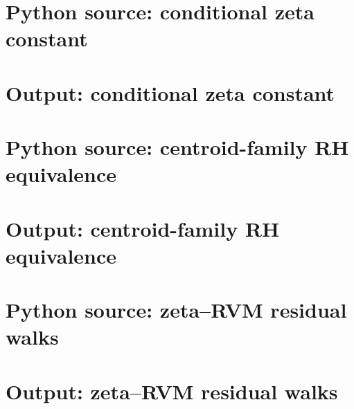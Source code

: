 \documentclass[11pt]{amsart}
\numberwithin{equation}{section}
\theoremstyle{definition}
\theoremstyle{remark}
\begin{document}
\section{Python source: conditional zeta constant}\label{sec:python_zeta_constant}


\section{Output: conditional zeta constant}\label{sec:output_zeta_constant}


\section{Python source: centroid-family RH equivalence}\label{sec:python_rh_equivalence}


\section{Output: centroid-family RH equivalence}\label{sec:output_rh_equivalence}


\section{Python source: zeta--RVM residual walks}\label{sec:python_rvm_residual_walks}


\section{Output: zeta--RVM residual walks}\label{sec:output_rvm_residual_walks}

\end{document}

